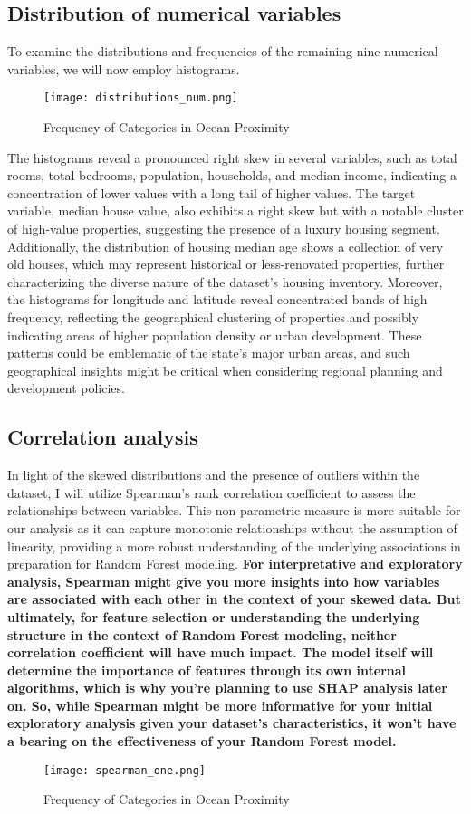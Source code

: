 \documentclass[12pt]{article}
\begin{document}
\subsection{Distribution of numerical variables}
To examine the distributions and frequencies of the remaining nine numerical variables, we will now employ histograms.
\begin{figure}[htbp]
	\centering
	\texttt{[image: distributions\_num.png]}
	\caption{Frequency of Categories in Ocean Proximity}
	\label{fig:distributions}
\end{figure}
The histograms reveal a pronounced right skew in several variables, such as total rooms, total bedrooms, population, households, and median income, indicating a concentration of lower values with a long tail of higher values. The target variable, median house value, also exhibits a right skew but with a notable cluster of high-value properties, suggesting the presence of a luxury housing segment. Additionally, the distribution of housing median age shows a collection of very old houses, which may represent historical or less-renovated properties, further characterizing the diverse nature of the dataset's housing inventory.
Moreover, the histograms for longitude and latitude reveal concentrated bands of high frequency, reflecting the geographical clustering of properties and possibly indicating areas of higher population density or urban development. These patterns could be emblematic of the state's major urban areas, and such geographical insights might be critical when considering regional planning and development policies.

\subsection{Correlation analysis}
In light of the skewed distributions and the presence of outliers within the dataset, I will utilize Spearman's rank correlation coefficient to assess the relationships between variables. This non-parametric measure is more suitable for our analysis as it can capture monotonic relationships without the assumption of linearity, providing a more robust understanding of the underlying associations in preparation for Random Forest modeling.
\textbf{For interpretative and exploratory analysis, Spearman might give you more insights into how variables are associated with each other in the context of your skewed data. But ultimately, for feature selection or understanding the underlying structure in the context of Random Forest modeling, neither correlation coefficient will have much impact. The model itself will determine the importance of features through its own internal algorithms, which is why you're planning to use SHAP analysis later on.
So, while Spearman might be more informative for your initial exploratory analysis given your dataset's characteristics, it won't have a bearing on the effectiveness of your Random Forest model.}
\begin{figure}[htbp]
	\centering
	\texttt{[image: spearman\_one.png]}
	\caption{Frequency of Categories in Ocean Proximity}
	\label{fig:corr_one}
\end{figure}
\end{document}
